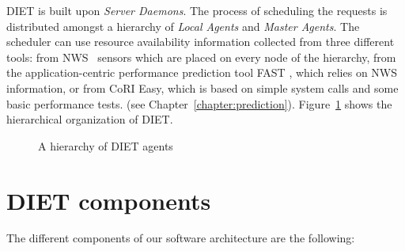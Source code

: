 \textsc{DIET} is built upon \emph{Server Daemons}. The process of
scheduling the requests is distributed amongst a hierarchy of
\emph{Local Agents} and \emph{Master Agents}. The scheduler can use
resource availability information collected from three different tools:
from NWS~\cite{WSH99} sensors which are placed on every node of the hierarchy,
from the application-centric performance prediction tool \textsc{FAST}
\cite{Qui02}, which relies on NWS information,
or from CoRI Easy, which is based on simple system calls and some basic
performance tests. (see Chapter~\ref{chapter:prediction}).
Figure~\ref{fig:platform} shows the hierarchical organization of
DIET.

\begin{figure}[htb]
 \begin{center}
  \caption{\label{fig:platform}A hierarchy of DIET agents}
 \end{center}
\end{figure}

\section{DIET components}
\label{sec:components}

The different components of our software architecture are the following:


